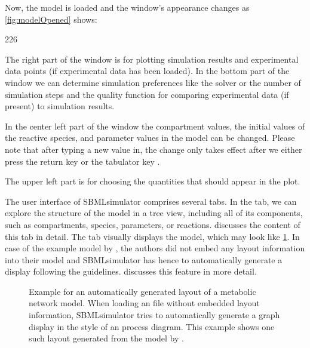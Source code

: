 Now, the model is loaded and the window's appearance changes as \cref{fig:modelOpened} shows:
\begin{dinglist}{226}
  \item The right part of the window is for plotting simulation results and experimental data points (if experimental data has been loaded).
In the bottom part of the window we can determine simulation preferences like the solver or the number of simulation steps and the quality function for comparing experimental data (if present) to simulation results.
  \item In the center left part of the window the compartment values, the initial values of the reactive species, and parameter values in the model can be changed.
  Please note that after typing a new value in, the change only takes effect after we either press the return key \keys{\return} or the tabulator key \keys{\tab}.
  \item The upper left part is for choosing the quantities that should appear in the plot.
\end{dinglist}
The user interface of SBMLsimulator comprises several tabs.
In the  tab, we can explore the structure of the model in a tree view, including all of its components, such as compartments, species, parameters, or reactions.
 discusses the content of this tab in detail.
The  tab visually displays the model, which may look like \cref{fig:AutomatedLayout}.
In case of the example model by \citeauthor{Bucher2011}, the authors did not embed any layout information into their model and SBMLsimulator has hence to automatically generate a display following the \SBGN guidelines.
 discusses this feature in more detail.
\begin{figure}[htb]
  \caption[Example for an automatically generated layout of a metabolic network model]{Example for an automatically generated layout of a metabolic network model.
  When loading an \SBML file without embedded layout information, SBMLsimulator tries to automatically generate a graph display in the style of an \SBGN process diagram.
  This example shows one such layout generated from the model by \citeauthor{Bucher2011}.}
  \label{fig:AutomatedLayout}
\end{figure}

